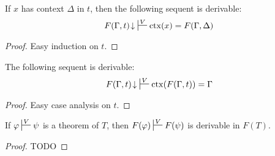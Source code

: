\documentclass[reqno]{amsart}
\theoremstyle{definition}
\theoremstyle{remark}
\newcommand{\fs}[1]{\mathrm{#1}}
\newcommand{\ctx}{\fs{ctx}}
\numberwithin{figure}{section}
\begin{document}
\begin{lem}
If $x$ has context $\Delta$ in $t$, then the following sequent is derivable:
\[ F(\Gamma,t)\!\downarrow\ \sststile{}{V} \ctx(x) = F(\Gamma,\Delta) \]
\end{lem}
\begin{proof}
Easy induction on $t$.
\end{proof}

\begin{lem}
The following sequent is derivable:
\[ F(\Gamma,t)\!\downarrow\ \sststile{}{V} \ctx(F(\Gamma,t)) = \Gamma \]
\end{lem}
\begin{proof}
Easy case analysis on $t$.
\end{proof}

\begin{lem}[ftmap-th]
If $\varphi \sststile{}{V} \psi$ is a theorem of $T$, then $F(\varphi) \sststile{}{V} F(\psi)$ is derivable in $F(T)$.
\end{lem}
\begin{proof}
TODO
\end{proof}
\end{document}
